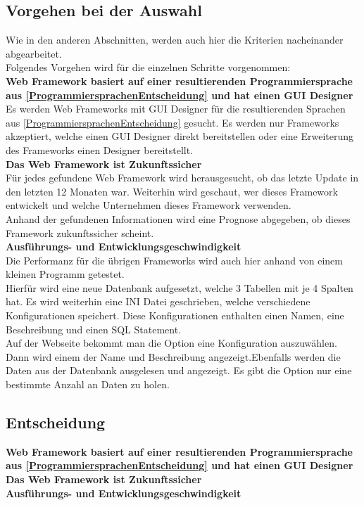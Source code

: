 \documentclass[ngerman]{article}
\begin{document}
    \subsection{Vorgehen bei der Auswahl}
    Wie in den anderen Abschnitten, werden auch hier die Kriterien nacheinander abgearbeitet.\\
    Folgendes Vorgehen wird für die einzelnen Schritte vorgenommen:\\
    \textbf{Web Framework basiert auf einer resultierenden Programmiersprache aus \ref{ProgrammiersprachenEntscheidung} und hat einen GUI Designer}\\
    Es werden Web Frameworks mit GUI Designer für die resultierenden Sprachen aus \ref{ProgrammiersprachenEntscheidung} gesucht. Es werden nur Frameworks akzeptiert, welche einen GUI Designer direkt bereitstellen oder eine Erweiterung des Frameworks einen Designer bereitstellt.\\
    \textbf{Das Web Framework ist Zukunftssicher}\\
    Für jedes gefundene Web Framework wird herausgesucht, ob das letzte Update in den letzten 12 Monaten war. Weiterhin wird geschaut, wer dieses Framework entwickelt und welche Unternehmen dieses Framework verwenden.\\
    Anhand der gefundenen Informationen wird eine Prognose abgegeben, ob dieses Framework zukunftssicher scheint.\\
    \textbf{Ausführungs- und Entwicklungsgeschwindigkeit}\\
    Die Performanz für die übrigen Frameworks wird auch hier anhand von einem kleinen Programm getestet.\\
    Hierfür wird eine neue Datenbank aufgesetzt, welche 3 Tabellen mit je 4 Spalten hat. Es wird weiterhin eine INI Datei geschrieben, welche verschiedene Konfigurationen speichert. Diese Konfigurationen enthalten einen Namen, eine Beschreibung und einen SQL Statement.\\
    Auf der Webseite bekommt man die Option eine Konfiguration auszuwählen. Dann wird einem der Name und Beschreibung angezeigt.Ebenfalls werden die Daten aus der Datenbank ausgelesen und angezeigt. Es gibt die Option nur eine bestimmte Anzahl an Daten zu holen.
    \subsection{Entscheidung}
    \textbf{Web Framework basiert auf einer resultierenden Programmiersprache aus \ref{ProgrammiersprachenEntscheidung} und hat einen GUI Designer}\\
    \textbf{Das Web Framework ist Zukunftssicher}\\
    \textbf{Ausführungs- und Entwicklungsgeschwindigkeit}\\
    \newpage\noindent
\end{document}
